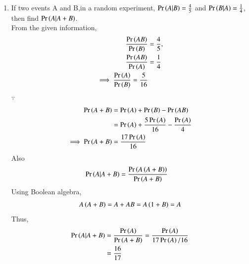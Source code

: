 \renewcommand{\theequation}{\theenumi}
\renewcommand{\thefigure}{\theenumi}
\begin{enumerate}[label=\thesection.\arabic*.,ref=\thesection.\theenumi]
%
%
\item  If two events A and B,in a random experiment, 
$\Pr\left(A|B\right)=\frac{4}{5}$ and $\Pr\left(B|A\right)=\frac{1}{4}$, then find 
$\Pr\left(A|A+B\right)$.
\\
\solution  From the given information,
\begin{align}
\frac{\Pr\left(AB\right)}{\Pr\left(B\right)}&=\frac{4}{5},\\
\frac{\Pr\left(AB\right)}{\Pr\left(A\right)}&=\frac{1}{4}\\
\implies \frac{\Pr\left(A\right)}{\Pr\left(B\right)}=\frac{5}{16}
\end{align}
$\because$
\begin{align}
\Pr\left(A+B\right) & =\Pr\left(A\right)+\Pr\left(B\right)-\Pr\left(AB\right)\\
    & =\Pr\left(A\right)+\frac{5\Pr\left(A\right)}{16}-\frac{\Pr\left(A\right)}{4}\\
\implies  \Pr\left(A+B\right)&=\frac{17\Pr\left(A\right)}{16}
\end{align}
Also
\begin{align}
 \Pr\left(A|A+B\right)&=\frac{\Pr\left(A\left(A+B\right)\right)}{\Pr\left(A+B\right)}
\end{align}
Using Boolean algebra,
\begin{align}
A\left(A+B\right) = A + AB = A\left(1+B\right) = A
\end{align}
Thus, 
\begin{align}
 \Pr\left(A|A+B\right)&=\frac{\Pr\left(A\right)}{\Pr\left(A+B\right)}
          =\frac{\Pr\left(A\right)}{17\Pr\left(A\right)/16}\\
          &=\frac{16}{17}\
\end{align}

\end{enumerate}
